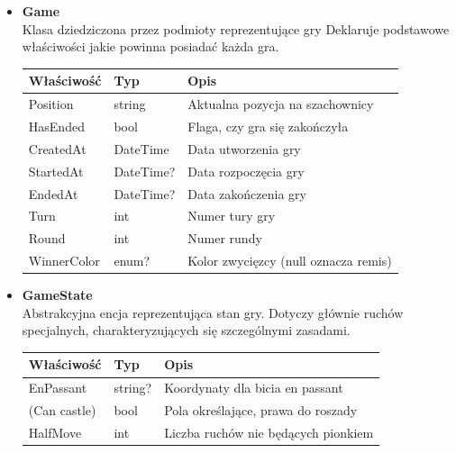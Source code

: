 \documentclass[twoside]{projektInzynierskiMS1}
\begin{document}
\begin{itemize}
    \item \textbf{Game}\\
    Klasa dziedziczona przez podmioty reprezentujące gry Deklaruje podstawowe właściwości jakie powinna posiadać każda gra.
    \renewcommand{\arraystretch}{1.2}
    \begin{longtable}{|m{4cm}|m{2cm}|m{8cm}|}
        \hline
        \rowcolor{lightgray}
        \textbf{Właściwość} & \textbf{Typ} & \textbf{Opis} \\ \hline
        \endhead
        \hline
        Position & string & Aktualna pozycja na szachownicy \\ \hline
        HasEnded & bool & Flaga, czy gra się zakończyła \\ \hline
        CreatedAt & DateTime & Data utworzenia gry \\ \hline
        StartedAt & DateTime? & Data rozpoczęcia gry \\ \hline
        EndedAt & DateTime? & Data zakończenia gry \\ \hline
        Turn & int & Numer tury gry \\ \hline
        Round & int & Numer rundy \\ \hline
        WinnerColor & enum? & Kolor zwycięzcy (null oznacza remis) \\ \hline
    \end{longtable}

    \item \textbf{GameState}\\
    Abstrakcyjna encja reprezentująca stan gry. Dotyczy głównie ruchów specjalnych, charakteryzujących się szczególnymi zasadami.
    \renewcommand{\arraystretch}{1.2}
    \begin{longtable}{|m{4cm}|m{2cm}|m{8cm}|}
        \hline
        \rowcolor{lightgray}
        \textbf{Właściwość} & \textbf{Typ} & \textbf{Opis} \\ \hline
        \endhead
        \hline
        EnPassant & string? & Koordynaty dla bicia en passant \\ \hline
        (Can castle) & bool & Pola określające, prawa do roszady \\ \hline
        HalfMove & int & Liczba ruchów nie będących pionkiem  \\ \hline
    \end{longtable}


\end{itemize}
\end{document}
